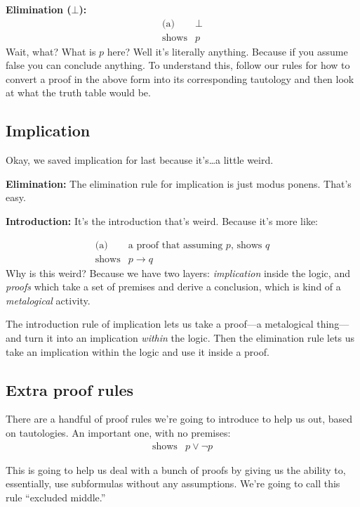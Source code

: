 \documentclass[11pt]{article}
\begin{document}
\noindent\textbf{Elimination ($\bot$):}
\[
  \begin{array}{rl}
    \text{(a)} & \bot \\
    \hline
    \text{shows} & p
  \end{array}
\]
Wait, what? What is $p$ here? Well it's literally anything. Because if you assume false you can conclude anything. To understand this, follow our rules for how to convert a proof in the above form into its corresponding tautology and then look at what the truth table would be.

\subsection{Implication}

Okay, we saved implication for last because it's\ldots a little weird.

\noindent\textbf{Elimination:}
The elimination rule for implication is just modus ponens. That's easy.

\noindent\textbf{Introduction:}
It's the introduction that's weird. Because it's more like:

\[
  \begin{array}{rl}
    \text{(a)} & \text{a proof that assuming $p$, shows $q$} \\
    \hline
    \text{shows} & p \to q
  \end{array}
\]
Why is this weird? Because we have two layers: \emph{implication} inside the logic, and \emph{proofs} which take a set of premises and derive a conclusion, which is kind of a \emph{metalogical} activity.

The introduction rule of implication lets us take a proof---a metalogical thing---and turn it into an implication \emph{within} the logic. Then the elimination rule lets us take an implication within the logic and use it inside a proof.

\subsection{Extra proof rules}

There are a handful of proof rules we're going to introduce to help us out, based on tautologies. An important one, with no premises:
\[
  \begin{array}{rl}
    \hline
    \text{shows} & p \vee \lnot p
  \end{array}
\]

This is going to help us deal with a bunch of proofs by giving us the ability to, essentially, use subformulas without any assumptions. We're going to call this rule ``excluded middle.''
\end{document}
